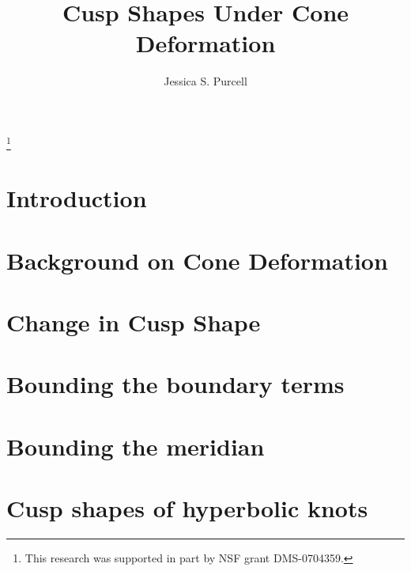 \documentclass[11pt]{amsart}
\theoremstyle{plain}
\theoremstyle{definition}
\begin{document}
\title{Cusp Shapes Under Cone Deformation}
\author{Jessica S. Purcell}
\thanks{This research was supported in part by NSF grant DMS-0704359.}

\address{Department of Mathematics, Brigham Young
	University, Provo, UT 84602, U.S.A}
\address{Mathematical Institute, University of Oxford, 24-29 St
	Giles', Oxford, OX1 3LB, U.K.}

\begin{abstract}
  
\end{abstract}

\maketitle


\section{Introduction \label{sec:intro}}


\section{Background on Cone Deformation \label{sec:deform-cone}}


\section{Change in Cusp Shape \label{sec:cusp-est}}


\section{Bounding the boundary terms \label{sec:bdrybound}}


\section{Bounding the meridian \label{sec:merbound}}


\section{Cusp shapes of hyperbolic knots \label{sec:knots}}

\end{document}
